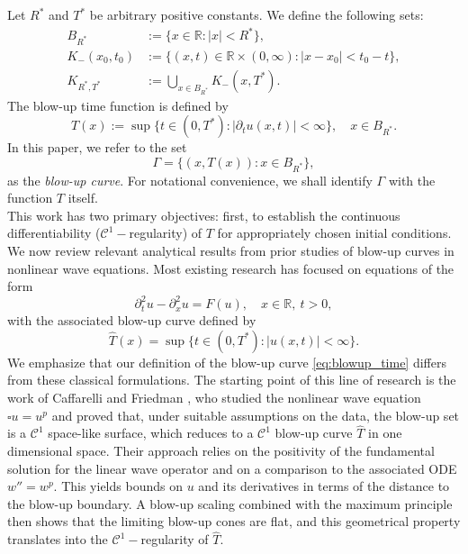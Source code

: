 \documentclass[
  sn-mathphys-num,
  colorlinks,
  linkcolor=darkmagenta,
  citecolor=rufous,
  urlcolor=zaffre,
  hypertexnames=false
]{sn-jnl}
\numberwithin{equation}{section}
\begin{document}
Let $R^*$ and $T^*$ be arbitrary positive constants. We define the following sets:
\begin{align}
B_{R^*} &:= \{ x \in \mathbb{R} : |x| < R^* \}, \label{eq:ball} \\
K_{-}(x_0, t_0) &:= \{ (x, t) \in \mathbb{R} \times (0, \infty) : |x - x_0| < t_0 - t \}, \label{eq:cone} \\
K_{R^*, T^*} &:= \bigcup_{x \in B_{R^*}} K_{-}(x, T^*). \label{eq:union}
\end{align}
The blow-up time function is defined by
\begin{equation}
T(x) := \sup \{ t \in (0, T^*) : |\partial_t u(x, t)| < \infty \}, \quad x \in B_{R^*}. \label{eq:blowup_time}
\end{equation}
In this paper, we refer to the set 
$$
\Gamma = \{(x, T(x)) : x \in B_{R^*}\},
$$ 
as the \textit{blow-up curve}. For notational convenience, we shall identify $\Gamma$ with the function $T$ itself. \\
This work has two primary objectives: first, to establish the continuous differentiability ($\mathcal{C}^1-$regularity) of $T$ for appropriately chosen initial conditions. We now review relevant analytical results from prior studies of blow-up curves in nonlinear wave equations. Most existing research has focused on equations of the form
$$
\partial_t^2 u - \partial_x^2 u = F(u), \quad x \in \mathbb{R},\ t > 0,
$$
with the associated blow-up curve defined by
$$
\hat{T}(x) = \sup \{ t \in (0, T^*) : |u(x,t)| < \infty \}.
$$  
We emphasize that our definition of the blow-up curve \eqref{eq:blowup_time} differs from these classical formulations. The starting point of this line of research is the work of Caffarelli and Friedman \cite{Caffarelli1985,Caffarelli1986}, who studied the nonlinear wave equation $\square u = u^{p}$ and proved that, under suitable assumptions on the data, the blow-up set is a $\mathcal{C}^{1}$ space-like surface, which reduces to a $\mathcal{C}^{1}$ blow-up curve $\hat T$ in  one dimensional space. Their approach relies on the positivity of the fundamental solution for the linear wave operator and on a comparison to the associated ODE $w'' = w^{p}$. This yields  bounds on $u$ and its derivatives in terms of the distance to the blow-up boundary. A blow-up scaling combined with the maximum principle then shows that the limiting blow-up cones are flat, and this geometrical property translates into the $\mathcal{C}^{1}-$regularity of $\hat T$.
\end{document}
